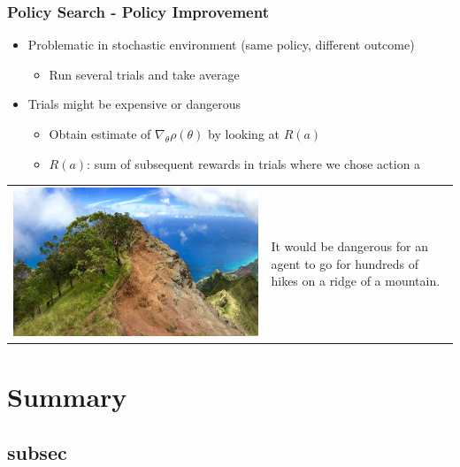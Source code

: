 \begin{frame}
	\frametitle{Policy Search - Policy Improvement}
	\begin{itemize}
    	\item Problematic in stochastic environment (same policy, different outcome)
		\begin{itemize}
    		\item Run several trials and take average
    	\end{itemize}
    	\item Trials might be expensive or dangerous
		\begin{itemize}
    		\item Obtain estimate of $\nabla_{\theta}\rho(\theta)$ by looking at $R(a)$
    		\item $R(a)$: sum of subsequent rewards in trials where we chose action a
    	\end{itemize}
    \end{itemize}
	\begin{tabular}{C{5.5cm}  L{4cm}}
		\includegraphics[width=\linewidth]{img-michael/mountain_ridge.png} & It would be dangerous for an agent to go for hundreds of hikes on a ridge of a mountain.
	\end{tabular}
\end{frame}

\section{Summary}
\subsection{subsec} %


